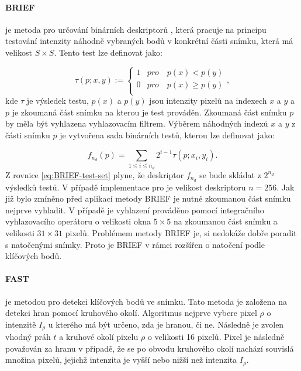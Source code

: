 \paragraph{BRIEF} je metoda pro určování binárních deskriptorů , která pracuje na principu testování intenzity náhodně vybraných bodů v konkrétní části snímku, která má velikost $S \times S$. Tento test lze definovat jako:

\begin{equation}
\label{eq:BRIEF-test}
\tau \left (p; x,y \right ):= \left\{\begin{matrix}
1 & pro \quad p\left( x\right ) < p \left(y \right )\\ 
0 & pro \quad p\left( x\right ) \geq  p \left(y \right )\\ 
\end{matrix}\right.,
\end{equation}
kde $\tau$ je výsledek testu, $p\left(x\right)$ a $p\left(y\right)$ jsou intenzity pixelů na indexech $x$ a $y$ a $p$ je zkoumaná část snímku na kterou  je test prováděn. Zkoumaná část snímku $p$ by měla být vyhlazena vyhlazovacím filtrem. Výběrem náhodných indexů $x$ a $y$ z části snímku $p$ je vytvořena sada binárních testů, kterou lze definovat jako:

\begin{equation}
\label{eq:BRIEF-test-set}
f_{n_{d}} \left(p \right ) = \sum_{1\leq i\leq n_{d}} 2^{i-1} \tau \left(p; x_i, y_i \right ).
\end{equation}
Z rovnice \ref{eq:BRIEF-test-set} plyne, že deskriptor $f_{n_d}$ se bude skládat z $2^{n_d}$ výsledků testů. \cite{brief} V případě implementace pro  je velikost deskriptoru $n = 256$. Jak již bylo zmíněno před aplikací metody BRIEF je nutné zkoumanou část snímku nejprve vyhladit. V případě  je vyhlazení prováděno pomocí integračního vyhlazovacího operátoru o velikosti okna $5 \times 5$ na zkoumanou část snímku a velikosti $31 \times 31$ pixelů. Problémem metody BRIEF je, si nedokáže dobře poradit s natočenými snímky. Proto je BRIEF v rámci  rozšířen o natočení podle klíčových bodů. \cite{orb}

\paragraph{FAST} je metodou pro detekci klíčových bodů ve snímku. Tato metoda je založena na detekci hran pomocí kruhového okolí. Algoritmus nejprve vybere pixel $\rho$  o intenzitě $I_\rho$ u kterého má být určeno, zda je hranou, či ne. Následně je zvolen vhodný práh $t$ a kruhové okolí pixelu $\rho$ o velikosti 16 pixelů. Pixel je následně považován za hranu v případě, že se po obvodu kruhového okolí nachází souvislá množina pixelů, jejichž intenzita je vyšší nebo nižší než intenzita $I_\rho$. 

